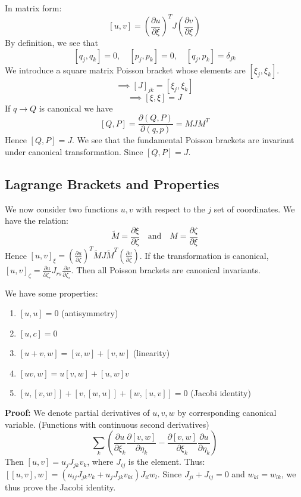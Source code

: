 \documentclass[12pt]{article}
\begin{document}
	In matrix form:
	\[ [u,v] = \left(\frac{\partial u}{\partial \xi}\right)^T J \left(\frac{\partial v}{\partial \xi}\right) \]
	By definition, we see that
	\[ [q_j, q_k] = 0, \quad [p_j, p_k] = 0, \quad [q_j, p_k] = \delta_{jk} \]
	We introduce a square matrix Poisson bracket whose elements are $[\xi_j, \xi_k]$.
	\[ \implies [J]_{jk} = [\xi_j, \xi_k] \]
	\[ \implies [\xi, \xi] = J \]
	If $q \to Q$ is canonical we have
	\[ [Q,P] = \frac{\partial(Q,P)}{\partial(q,p)} = M J M^T \]
	Hence $[Q,P] = J$. We see that the fundamental Poisson brackets are invariant under canonical transformation. Since $[Q,P]=J$.
	
	\subsection*{Lagrange Brackets and Properties}
	We now consider two functions $u, v$ with respect to the $j$ set of coordinates. We have the relation:
	\[ \tilde{M} = \frac{\partial \xi}{\partial \zeta} \quad \text{and} \quad M = \frac{\partial \zeta}{\partial \xi} \]
	Hence $[u,v]_{\xi} = \left( \frac{\partial u}{\partial \zeta} \right)^T \tilde{M} J \tilde{M}^T \left( \frac{\partial v}{\partial \zeta} \right)$.
	If the transformation is canonical, $[u,v]_{\zeta} = \frac{\partial u}{\partial \zeta_r} J_{rs} \frac{\partial v}{\partial \zeta_s}$.
	Then all Poisson brackets are canonical invariants.
	
	We have some properties:
	\begin{enumerate}
		\item $[u,u] = 0$ (antisymmetry)
		\item $[u, c] = 0$
		\item $[u+v, w] = [u,w] + [v,w]$ (linearity)
		\item $[uv, w] = u[v,w] + [u,w]v$
		\item $[u, [v,w]] + [v, [w,u]] + [w, [u,v]] = 0$ (Jacobi identity)
	\end{enumerate}
	\textbf{Proof:} We denote partial derivatives of $u,v,w$ by corresponding canonical variable.
	(Functions with continuous second derivatives)
	\[ \sum_k \left( \frac{\partial u}{\partial \xi_k} \frac{\partial [v,w]}{\partial \eta_k} - \frac{\partial [v,w]}{\partial \xi_k} \frac{\partial u}{\partial \eta_k} \right) \]
	Then $[u,v] = u_j J_{jk} v_k$, where $J_{ij}$ is the element.
	Thus: $[[u,v],w] = (u_{ij} J_{jk} v_k + u_j J_{jk} v_{ki}) J_{il} w_l$.
	Since $J_{ji} + J_{ij} = 0$ and $w_{kl} = w_{lk}$,
	we thus prove the Jacobi identity.
	
\end{document}

